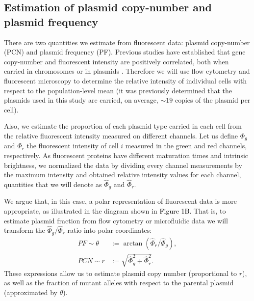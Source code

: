\documentclass[fleqn,12pt]{wlscirep}
\newcommand{\fig}[1]{\textcolor{black}{#1}}
\begin{document}
\subsection{Estimation of plasmid copy-number and plasmid frequency}

There are two quantities we estimate from fluorescent data: plasmid copy-number (PCN) and plasmid frequency (PF). 
Previous studies have established that gene copy-number and fluorescent intensity are positively correlated, both when carried in chromosomes\cite{bergmiller2017biased} or in plasmids \cite{ghozzi2010inference,Rodriguez2018}.  Therefore we will use flow cytometry and fluorescent microscopy to determine the relative intensity of individual cells with respect to the population-level mean (it was previously determined that the plasmids used in this study are carried, on average, $\sim 19$ copies of the plasmid per cell)\cite{san2016multicopy}. 

Also, we estimate the proportion of each plasmid type carried in each cell from the relative fluorescent intensity measured on different channels.  
Let us define $\Phi_g$ and $\Phi_r$ the fluorescent intensity of cell $i$ measured in the green and red channels, respectively.  As fluorescent proteins have different maturation times and intrinsic brightness\cite{Balleza2018}, we normalized the data by dividing every channel measurements by the maximum intensity and obtained relative intensity values for each channel, quantities that we will denote as $\hat{\Phi}_g$ and $\hat{\Phi}_r$.  

We argue that, in this case, a polar representation of fluorescent data is more appropriate, as illustrated in the diagram shown in \fig{Figure 1B}.
That is, to estimate plasmid fraction from flow cytometry or microfluidic data we will transform the $\hat{\Phi}_g/\hat{\Phi}_r$ ratio into polar coordinates:
\begin{align*}
    PF \sim \theta &:=\arctan(\hat{\Phi}_r/\hat{\Phi}_g), \\
    PCN \sim r&:=\sqrt{\hat{\Phi}_g^2+\hat{\Phi}_r^2}.
\end{align*}
These expressions allow us to estimate plasmid copy number (proportional to $r$), as well as the fraction of mutant alleles with respect to the parental plasmid (approximated by $\theta$). 

\end{document}
